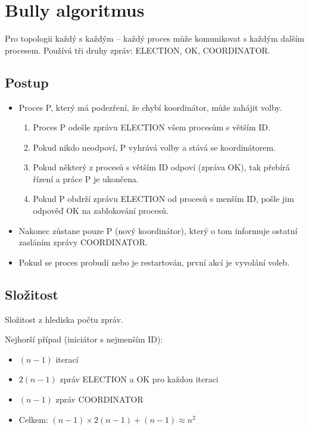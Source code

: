 
\section{Bully algoritmus}

Pro topologii každý s každým -- každý proces může komunikovat s každým dalším procesem. Používá tři druhy zpráv: ELECTION, OK, COORDINATOR.

\subsection*{Postup}

\begin{itemize}
    \item Proces P, který má podezření, že chybí koordinátor, může zahájit volby.
    \begin{enumerate}
        \item Proces P odešle zprávu ELECTION všem procesům s větším ID.
        \item Pokud nikdo neodpoví, P vyhrává volby a stává se koordinátorem.
        \item Pokud některý z procesů s větším ID odpoví (zpráva OK), tak přebírá řízení a práce P je ukončena.
        \item Pokud P obdrží zprávu ELECTION od procesů s menším ID, pošle jim odpověď OK na zablokování procesů.
    \end{enumerate}
    \item Nakonec zůstane pouze P (nový koordinátor), který o tom informuje ostatní zasláním zprávy COORDINATOR.
    \item Pokud se proces probudí nebo je restartován, první akcí je vyvolání voleb.
\end{itemize}

\subsection*{Složitost}

Složitost z hlediska počtu zpráv.

\bigskip\noindent Nejhorší případ (iniciátor s nejmenším ID):

\begin{itemize}
    \item $(n-1)$ iterací
    \item $2(n-1)$ zpráv ELECTION a OK pro každou iteraci
    \item $(n-1)$ zpráv COORDINATOR
    \item Celkem: $(n-1) \times 2(n-1) + (n-1) \approx n^2$
\end{itemize}

